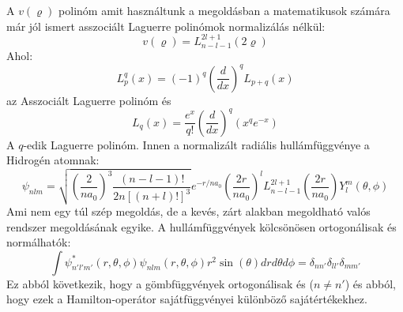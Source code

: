 \documentclass[../main.tex]{subfiles}
\begin{document}
A $v(\varrho)$ polinóm amit használtunk a megoldásban a matematikusok számára már jól ismert asszociált Laguerre polinómok normalizálás nélkül:
\begin{equation}
    v(\varrho) = L_{n - l - 1}^{2l + 1}(2\varrho)
\end{equation}
Ahol:
\begin{equation}
    L_p^q(x) = (-1)^q \left(\frac{d}{dx}\right)^q L_{p + q}(x)
\end{equation}
az Asszociált Laguerre polinóm és
\begin{equation}
    L_q(x) = \frac{e^x}{q!} \left(\frac{d}{dx}\right)^q (x^q e^{-x})
\end{equation}
A $q$-edik Laguerre polinóm. Innen a normalizált radiális hullámfüggvénye a Hidrogén atomnak:
\begin{equation}
    \psi_{n l m} = \sqrt{\left(\frac{2}{n a_0}\right)^3 \frac{(n - l - 1)!}{2 n [(n + l)!]^3}} e^{-r/na_0} \left(\frac{2r}{n a_0}\right)^l L_{n - l - 1}^{2l + 1} \left(\frac{2r}{n a_0}\right) Y_l^m(\theta, \phi)
\end{equation}
Ami nem egy túl szép megoldás, de a kevés, zárt alakban megoldható valós rendszer megoldásának egyike. A hullámfüggvények kölcsönösen ortogonálisak és normálhatók:
\begin{equation}
    \int \psi_{n' l' m'}^* (r, \theta, \phi) \psi_{n l m} (r, \theta, \phi) r^2 \sin(\theta) dr d\theta d\phi = \delta_{n n'} \delta_{l l'} \delta_{m m'}
\end{equation}
Ez abból következik, hogy a gömbfüggvények ortogonálisak és ($n \neq n'$) és abból, hogy ezek a Hamilton-operátor sajátfüggvényei különböző sajátértékekhez.
\end{document}
